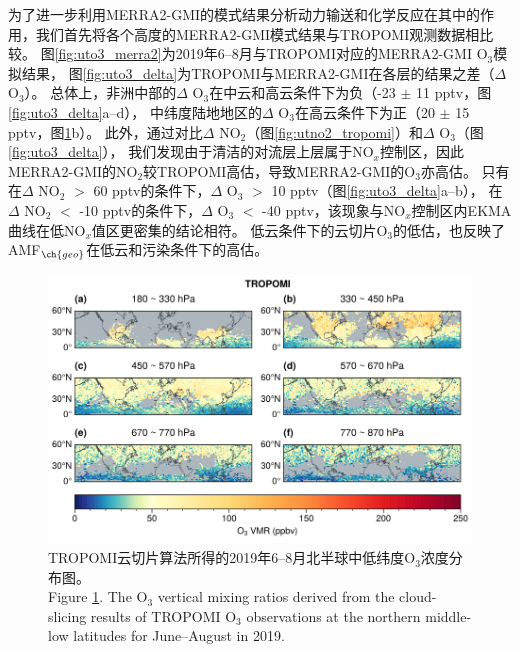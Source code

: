 为了进一步利用MERRA2-GMI的模式结果分析动力输送和化学反应在其中的作用，我们首先将各个高度的MERRA2-GMI模式结果与TROPOMI观测数据相比较。
图\ref{fig:uto3_merra2}为2019年6--8月与TROPOMI对应的MERRA2-GMI O$_3$模拟结果，
图\ref{fig:uto3_delta}为TROPOMI与MERRA2-GMI在各层的结果之差（$\Delta$ O$_3$）。
总体上，非洲中部的$\Delta$ O$_3$在中云和高云条件下为负（-23 $\pm$ 11 pptv，图\ref{fig:uto3_delta}a--d），
中纬度陆地地区的$\Delta$ O$_3$在高云条件下为正（20 $\pm$ 15 pptv，图\ref{fig:uto3_tropomi}b）。
此外，通过对比$\Delta$ NO$_2$（图\ref{fig:utno2_tropomi}）和$\Delta$ O$_3$（图\ref{fig:uto3_delta}），
我们发现由于清洁的对流层上层属于NO$_x$控制区\citep{Brown.2022}，因此MERRA2-GMI的NO$_2$较TROPOMI高估，导致MERRA2-GMI的O$_3$亦高估。
只有在$\Delta$ NO$_2$ $>$ 60 pptv的条件下，$\Delta$ O$_3$ $>$ 10 pptv（图\ref{fig:uto3_delta}a--b），
在$\Delta$ NO$_2$ $<$ -10 pptv的条件下，$\Delta$ O$_3$ $<$ -40 pptv，该现象与NO$_x$控制区内EKMA曲线在低NO$_x$值区更密集的结论相符。
低云条件下的云切片O$_3$的低估，也反映了AMF$_{\ch{geo}}$在低云和污染条件下的高估\citep{BelmonteRivas.2015}。

\begin{figure}[H]
    \centering
    \includegraphics[width=16cm]{./figures/uto3_tropomi.png}
    \caption{
    TROPOMI云切片算法所得的2019年6--8月北半球中低纬度O$_3$浓度分布图。 \\
    Figure \ref{fig:uto3_tropomi}. The O$_3$ vertical mixing ratios derived from the cloud-slicing results of TROPOMI O$_3$ observations at the northern middle-low latitudes for June--August in 2019.
    }
    \label{fig:uto3_tropomi}
\end{figure}


